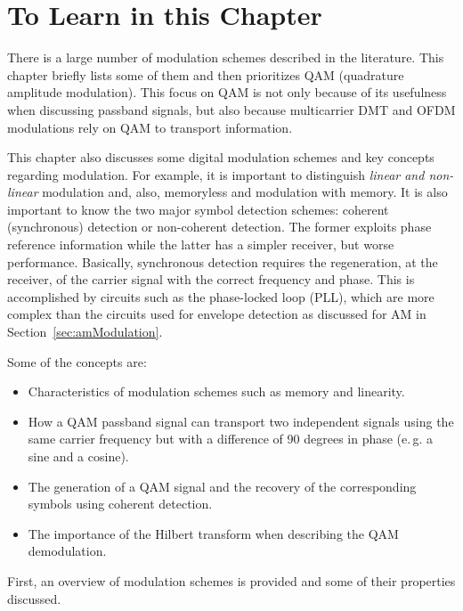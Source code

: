 \section{To Learn in this Chapter}

There is a large number of modulation schemes described in the literature. This chapter briefly lists some of them and then prioritizes QAM (quadrature amplitude modulation). This focus on QAM is not only because of its usefulness when discussing passband signals, but also because multicarrier DMT and OFDM modulations rely on QAM to transport information.

This chapter also discusses some digital modulation schemes and key concepts regarding modulation. For example, it is important to distinguish \emph{linear and non-linear} modulation and, also, memoryless and modulation with memory.
It is also important to know the two major symbol detection schemes: coherent (synchronous) detection or non-coherent detection. The former exploits phase reference information while the latter has a simpler receiver, but worse performance. Basically, synchronous detection requires the regeneration, at the receiver, of the carrier signal with the correct frequency and phase. This is accomplished by circuits such as the phase-locked loop (PLL), which are more complex than the circuits used for envelope detection as discussed for AM in Section~\ref{sec:amModulation}.

Some of the concepts are:
\begin{itemize}
\item Characteristics of modulation schemes such as memory and linearity.
\item How a QAM passband signal can transport two independent signals using the same carrier frequency but with a difference of 90 degrees in phase (e.\,g. a sine and a cosine).
\item The generation of a QAM signal and the recovery of the corresponding symbols using coherent detection.
\item The importance of the Hilbert transform when describing the QAM demodulation.
\end{itemize}

First, an overview of modulation schemes is provided and some of their properties discussed.


